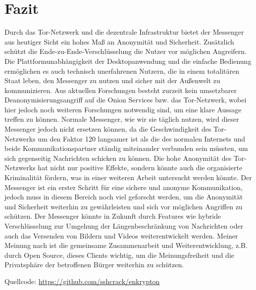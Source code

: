 \documentclass[a4paper,ngerman, headheight=28pt,12pt]{scrartcl}
\begin{document}
\section{Fazit}
Durch das Tor-Netzwerk und die dezentrale Infrastruktur bietet der Messenger aus heutiger Sicht ein hohes Maß an Anonymität und Sicherheit. Zusätzlich schützt die Ende-zu-Ende-Verschlüsselung die Nutzer vor möglichen Angreifern. Die Plattformunabhängigkeit der Desktopanwendung und die einfache Bedienung ermöglichen es auch technisch unerfahrenen Nutzern, die in einem totalitären Staat leben, den Messenger zu nutzen und sicher mit der Außenwelt zu kommunizieren. Aus aktuellen Forschungen besteht zurzeit kein umsetzbarer Deanonymisierungsangriff auf die Onion Services bzw. das Tor-Netzwerk, wobei hier jedoch noch weiteren Forschungen notwendig sind, um eine klare Aussage treffen zu können.
Normale Messenger, wie wir sie täglich nutzen, wird dieser Messenger jedoch nicht ersetzen können, da die Geschwindigkeit des Tor-Netzwerks um den Faktor 120 langsamer ist als die des normalen Internets und beide Kommunikationspartner ständig miteinander verbunden sein müssten, um sich gegenseitig Nachrichten schicken zu können. Die hohe Anonymität des Tor-Netzwerks hat nicht nur positive Effekte, sondern könnte auch die organisierte Kriminalität fördern, was in einer weiteren Arbeit untersucht werden könnte. Der Messenger ist ein erster Schritt für eine sichere und anonyme Kommunikation, jedoch muss in diesem Bereich noch viel geforscht werden, um die Anonymität und Sicherheit weiterhin zu gewährleisten und sich vor möglichen Angriffen zu schützen. Der Messenger könnte in Zukunft durch Features wie hybride Verschlüsselung zur Umgehung der Längenbeschränkung von Nachrichten oder auch das Versenden von Bildern und Videos weiterentwickelt werden. Meiner Meinung nach ist die gemeinsame Zusammenarbeit und Weiterentwicklung, z.B. durch Open Source, dieses Clients wichtig, um die Meinungsfreiheit und die Privatsphäre der betroffenen Bürger weiterhin zu schützen.
\pagebreak
\nolinenumbers{}
\printbibliography[notkeyword={figure}]
\label{LastPageDoc}

\pagebreak
{}%
\appendix
\printbibliography[heading=subbibliography,title={Anhang},keyword={figure}]
Quellcode: \href{https://github.com/sshcrack/enkrypton}{https://github.com/sshcrack/enkrypton}

\end{document}
